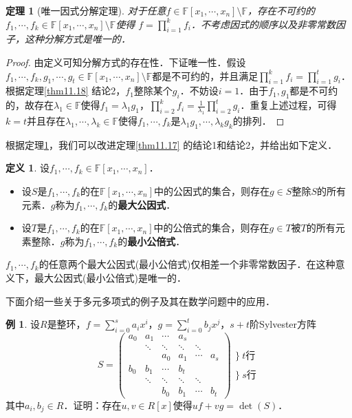 \documentclass[a4paper,fontset=windows]{ctexbook}
\newtheorem{theorem}{定理}[chapter]
\theoremstyle{definition}
\newtheorem{definition}{定义}[chapter]
\newtheorem{example}{例}[chapter]
\begin{document}
\begin{theorem}[唯一因式分解定理]\label{thm11.19}
对于任意$f\in\mathbb{F}[x_1,\cdots,x_n]\setminus\mathbb{F}$，存在不可约的$f_1,\cdots,f_k\in\mathbb{F}[x_1,\cdots,x_n]\setminus\mathbb{F}$使得
$f=\prod\limits_{i=1}^kf_i$．不考虑因式的顺序以及非零常数因子，这种分解方式是唯一的．
\end{theorem}

\begin{proof}
由定义可知分解方式的存在性．下证唯一性．假设$f_1,\cdots,f_k,g_1,\cdots,g_t\in\mathbb{F}[x_1,\cdots,x_n]\setminus\mathbb{F}$都是不可约的，并且满足$\prod\limits_{i=1}^kf_i=\prod\limits_{i=1}^tg_i$．根据定理\ref{thm11.18} 结论2，$f_1$整除某个$g_i$．不妨设$i=1$．由于$f_1,g_1$都是不可约的，故存在$\lambda_1\in\mathbb{F}$使得$f_1=\lambda_1g_1$，$\prod\limits_{i=2}^kf_i=\frac{1}{\lambda_1}\prod\limits_{i=2}^tg_i$．重复上述过程，可得$k=t$并且存在$\lambda_1,\cdots,\lambda_k\in\mathbb{F}$使得$f_1,\cdots,f_k$是$\lambda_1g_1,\cdots,\lambda_kg_k$的排列．
\end{proof}

根据定理\ref{thm11.19}，我们可以改进定理\ref{thm11.17} 的结论1和结论2，并给出如下定义．

\begin{definition}
设$f_1,\cdots,f_k\in\mathbb{F}[x_1,\cdots,x_n]$．
\begin{itemize}
\item 设$S$是$f_1,\cdots,f_k$的在$\mathbb{F}[x_1,\cdots,x_n]$中的公因式的集合，则存在$g\in S$整除$S$的所有元素．$g$称为$f_1,\cdots,f_k$的{\bf 最大公因式}．

\item 设$T$是$f_1,\cdots,f_k$的在$\mathbb{F}[x_1,\cdots,x_n]$中的公倍式的集合，则存在$g\in T$被$T$的所有元素整除．$g$称为$f_1,\cdots,f_k$的{\bf 最小公倍式}．
\end{itemize}
$f_1,\cdots,f_k$的任意两个最大公因式(最小公倍式)仅相差一个非零常数因子．在这种意义下，最大公因式(最小公倍式)是唯一的．
\end{definition}

下面介绍一些关于多元多项式的例子及其在数学问题中的应用．

\begin{example}\label{ex11.10}
设$R$是整环，$f=\sum\limits_{i=0}^sa_ix^i$，$g=\sum\limits_{i=0}^tb_jx^j$，$s+t$阶Sylvester方阵
$$S=\begin{pmatrix}a_0&a_1&\cdots&a_s&& \\ &\ddots&\ddots&\ddots&\ddots& \\ &&a_0&a_1&\cdots&a_s \\ b_0&b_1&\cdots&b_t&& \\ &\ddots&\ddots&\ddots&\ddots& \\ &&b_0&b_1&\cdots&b_t\end{pmatrix}\begin{matrix}\Biggr\}~t\text{行} \\ ~ \\ \Biggr\}~s\text{行}\end{matrix}$$
其中$a_i,b_j\in R$．证明：存在$u,v\in R[x]$使得$uf+vg=\det(S)$．
\end{example}
\end{document}
